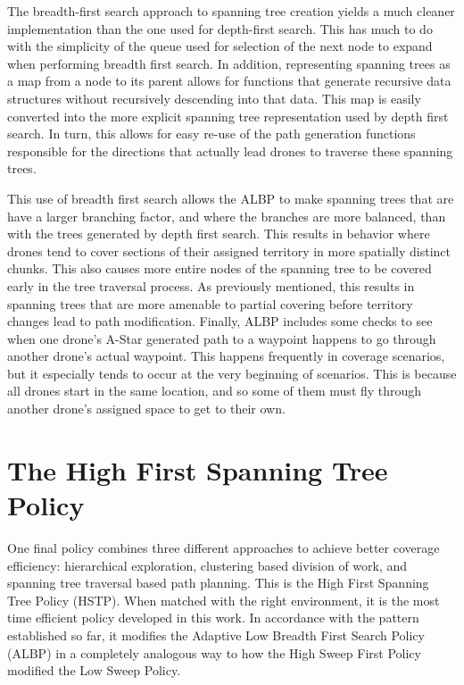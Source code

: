 The breadth-first search approach to spanning tree creation yields a much cleaner implementation than the one used for depth-first search. This has much to do with the simplicity of the queue used for selection of the next node to expand when performing breadth first search. In addition, representing spanning trees as a map from a node to its parent allows for functions that generate recursive data structures without recursively descending into that data. This map is easily converted into the more explicit spanning tree representation used by depth first search. In turn, this allows for easy re-use of the path generation functions responsible for the directions that actually lead drones to traverse these spanning trees.

This use of breadth first search allows the ALBP to make spanning trees that are have a larger branching factor, and where the branches are more balanced, than with the trees generated by depth first search. This results in behavior where drones tend to cover sections of their assigned territory in more spatially distinct chunks. This also causes more entire nodes of the spanning tree to be covered early in the tree traversal process. As previously mentioned, this results in spanning trees that are more amenable to partial covering before territory changes lead to path modification. Finally, ALBP includes some checks to see when one drone's A-Star generated path to a waypoint happens to go through another drone's actual waypoint. This happens frequently in coverage scenarios, but it especially tends to occur at the very beginning of scenarios. This is because all drones start in the same location, and so some of them must fly through another drone's assigned space to get to their own.

\section{The High First Spanning Tree Policy}

One final policy combines three different approaches to achieve better coverage efficiency: hierarchical exploration, clustering based division of work, and spanning tree traversal based path planning. This is the High First Spanning Tree Policy (HSTP). When matched with the right environment, it is the most time efficient policy developed in this work. In accordance with the pattern established so far, it modifies the Adaptive Low Breadth First Search Policy (ALBP) in a completely analogous way to how the High Sweep First Policy modified the Low Sweep Policy.

